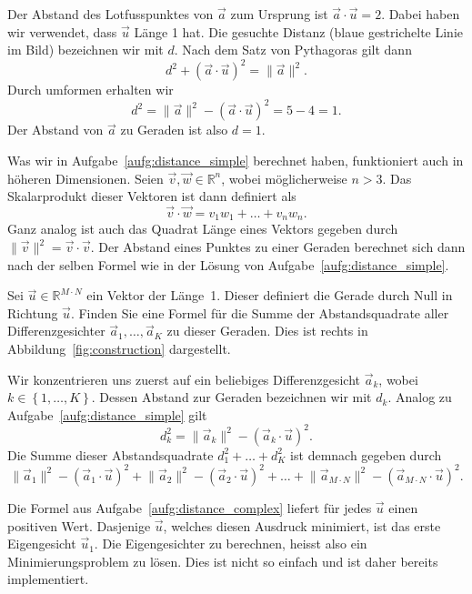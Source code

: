 \begin{losung*}
	Der Abstand des Lotfusspunktes von $\vec{a}$ zum Ursprung ist $\vec{a}\cdot\vec{u}=2$.
	Dabei haben wir verwendet, dass $\vec{u}$ Länge 1 hat.
	Die gesuchte Distanz (blaue gestrichelte Linie im Bild) bezeichnen wir mit $d$.
	Nach dem Satz von Pythagoras gilt dann
	\begin{equation*}
		d^2+\left(\vec{a}\cdot\vec{u}\right)^2=\lVert\vec{a}\rVert^2.
	\end{equation*}
	Durch umformen erhalten wir
	\begin{equation*}
		d^2=\lVert\vec{a}\rVert^2-\left(\vec{a}\cdot\vec{u}\right)^2=5-4=1.
	\end{equation*}
	Der Abstand von $\vec{a}$ zu Geraden ist also $d=1$.
\end{losung*}
Was wir in Aufgabe~\ref{aufg:distance_simple} berechnet haben, funktioniert auch in höheren Dimensionen.
Seien $\vec v,\vec w\in\mathbb R^n$, wobei möglicherweise $n>3$.
Das Skalarprodukt dieser Vektoren ist dann definiert als
\begin{equation*}
	\vec v\cdot\vec w=v_1w_1+\ldots+v_nw_n.
\end{equation*}
Ganz analog ist auch das Quadrat Länge eines Vektors gegeben durch $\lVert\vec v\rVert^2=\vec v\cdot\vec v$.
Der Abstand eines Punktes zu einer Geraden berechnet sich dann nach der selben Formel wie in der Lösung von Aufgabe~\ref{aufg:distance_simple}.
\begin{aufgabe} \label{aufg:distance_complex}
	Sei $\vec{u}\in\mathbb R^{M\cdot N}$ ein Vektor der Länge~1.
	Dieser definiert die Gerade durch Null in Richtung $\vec{u}$.
	Finden Sie eine Formel für die Summe der Abstandsquadrate aller Differenzgesichter $\vec{a}_1,\ldots,\vec{a}_K$ zu dieser Geraden.
	Dies ist rechts in Abbildung~\ref{fig:construction} dargestellt.
\end{aufgabe}
\begin{losung*}
	Wir konzentrieren uns zuerst auf ein beliebiges Differenzgesicht $\vec{a}_k$, wobei $k\in\left\{1,\ldots,K\right\}$.
	Dessen Abstand zur Geraden bezeichnen wir mit $d_k$.
	Analog zu Aufgabe~\ref{aufg:distance_simple} gilt
	\begin{equation*}
		d_k^2=\lVert\vec{a}_k\rVert^2-\left(\vec{a}_k\cdot\vec{u}\right)^2.
	\end{equation*}
	Die Summe dieser Abstandsquadrate $d_1^2+\ldots+d_K^2$ ist demnach gegeben durch
	\begin{equation*}
		\lVert\vec{a}_1\rVert^2-\left(\vec{a}_1\cdot\vec{u}\right)^2
		+\lVert\vec{a}_2\rVert^2-\left(\vec{a}_2\cdot\vec{u}\right)^2
		+\ldots+
		\lVert\vec{a}_{M\cdot N}\rVert^2-\left(\vec{a}_{M\cdot N}\cdot\vec{u}\right)^2.
	\end{equation*}
\end{losung*}
Die Formel aus Aufgabe~\ref{aufg:distance_complex} liefert für jedes $\vec{u}$ einen positiven Wert.
Dasjenige $\vec{u}$, welches diesen Ausdruck minimiert, ist das erste Eigengesicht $\vec{u}_1$.
Die Eigengesichter zu berechnen, heisst also ein Minimierungsproblem zu lösen.
Dies ist nicht so einfach und ist daher bereits implementiert.

